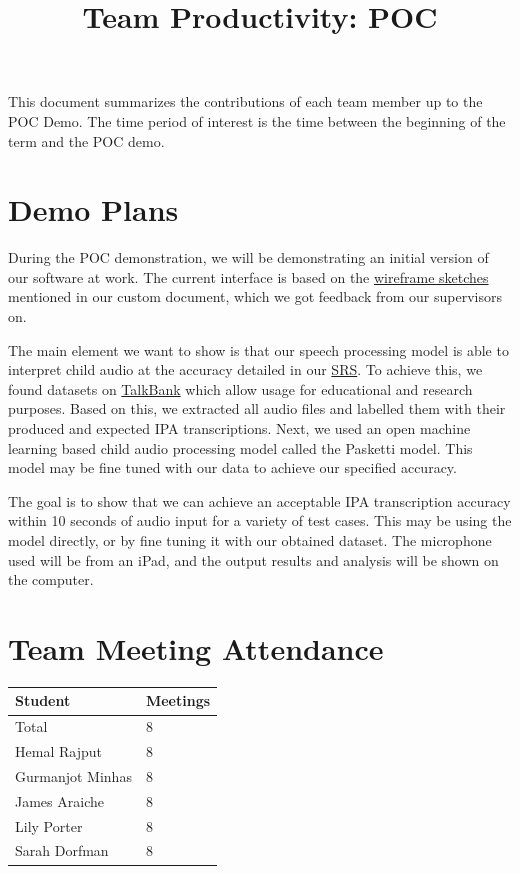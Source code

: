\documentclass{article}
\title{Team Productivity: POC\\\progname}
\author{\authname}
\date{}
\begin{document}
\maketitle

This document summarizes the contributions of each team member up to the POC
Demo.  The time period of interest is the time between the beginning of the term
and the POC demo.

\section{Demo Plans}

During the POC demonstration, we will be demonstrating an initial version of our software at work. The current interface is based on the \href{https://github.com/lilyporter/Ghoti/blob/main/pdfs/CDs/Wireframe/Wireframe.pdf}{wireframe sketches} mentioned in our custom document, which we got feedback from our supervisors on. 

The main element we want to show is that our speech processing model is able to interpret child audio at the accuracy detailed in our \href{https://github.com/lilyporter/Ghoti/blob/main/pdfs/SRS/SRS.pdf}{SRS}. To achieve this, we found datasets on \href{https://talkbank.org/phon/}{TalkBank} which allow usage for educational and research purposes. Based on this, we extracted all audio files and labelled them with their produced and expected IPA transcriptions. Next, we used an open machine learning based child audio processing model called the Pasketti model. This model may be fine tuned with our data to achieve our specified accuracy. 

The goal is to show that we can achieve an acceptable IPA transcription accuracy within 10 seconds of audio input for a variety of test cases. This may be using the model directly, or by fine tuning it with our obtained dataset. The microphone used will be from an iPad, and the output results and analysis will be shown on the computer. 

\section{Team Meeting Attendance}

\begin{table}[H]
\centering
\begin{tabular}{ll}
\toprule
\textbf{Student} & \textbf{Meetings}\\
\midrule
Total & 8\\
Hemal Rajput & 8\\
Gurmanjot Minhas & 8\\
James Araiche & 8\\
Lily Porter & 8\\
Sarah Dorfman & 8\\
\bottomrule
\end{tabular}
\end{table}
\end{document}
